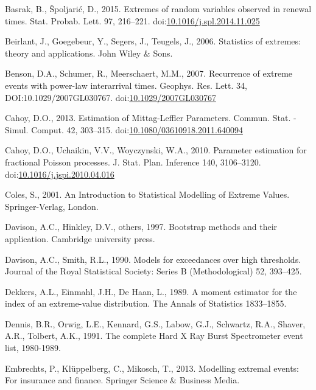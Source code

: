\documentclass[]{elsarticle} %
\begin{document}
\leavevmode\hypertarget{ref-Basrak2014}{}%
Basrak, B., Špoljarić, D., 2015. Extremes of random variables observed
in renewal times. Stat. Probab. Lett. 97, 216--221.
doi:\href{https://doi.org/10.1016/j.spl.2014.11.025}{10.1016/j.spl.2014.11.025}

\leavevmode\hypertarget{ref-beirlantBook}{}%
Beirlant, J., Goegebeur, Y., Segers, J., Teugels, J., 2006. Statistics
of extremes: theory and applications. John Wiley \& Sons.

\leavevmode\hypertarget{ref-Benson2007}{}%
Benson, D.A., Schumer, R., Meerschaert, M.M., 2007. Recurrence of
extreme events with power-law interarrival times. Geophys. Res. Lett.
34, DOI:10.1029/2007GL030767.
doi:\href{https://doi.org/10.1029/2007GL030767}{10.1029/2007GL030767}

\leavevmode\hypertarget{ref-Cahoy2013}{}%
Cahoy, D.O., 2013. Estimation of Mittag-Leffler Parameters. Commun.
Stat. - Simul. Comput. 42, 303--315.
doi:\href{https://doi.org/10.1080/03610918.2011.640094}{10.1080/03610918.2011.640094}

\leavevmode\hypertarget{ref-Cahoy2010}{}%
Cahoy, D.O., Uchaikin, V.V., Woyczynski, W.A., 2010. Parameter
estimation for fractional Poisson processes. J. Stat. Plan. Inference
140, 3106--3120.
doi:\href{https://doi.org/10.1016/j.jspi.2010.04.016}{10.1016/j.jspi.2010.04.016}

\leavevmode\hypertarget{ref-ColesBook}{}%
Coles, S., 2001. An Introduction to Statistical Modelling of Extreme
Values. Springer-Verlag, London.

\leavevmode\hypertarget{ref-davison1997bootstrap}{}%
Davison, A.C., Hinkley, D.V., others, 1997. Bootstrap methods and their
application. Cambridge university press.

\leavevmode\hypertarget{ref-davison1990models}{}%
Davison, A.C., Smith, R.L., 1990. Models for exceedances over high
thresholds. Journal of the Royal Statistical Society: Series B
(Methodological) 52, 393--425.

\leavevmode\hypertarget{ref-dekkers1989moment}{}%
Dekkers, A.L., Einmahl, J.H., De Haan, L., 1989. A moment estimator for
the index of an extreme-value distribution. The Annals of Statistics
1833--1855.

\leavevmode\hypertarget{ref-HXRBS}{}%
Dennis, B.R., Orwig, L.E., Kennard, G.S., Labow, G.J., Schwartz, R.A.,
Shaver, A.R., Tolbert, A.K., 1991. The complete Hard X Ray Burst
Spectrometer event list, 1980-1989.

\leavevmode\hypertarget{ref-embrechts2013modelling}{}%
Embrechts, P., Klüppelberg, C., Mikosch, T., 2013. Modelling extremal
events: For insurance and finance. Springer Science \& Business Media.
\end{document}
